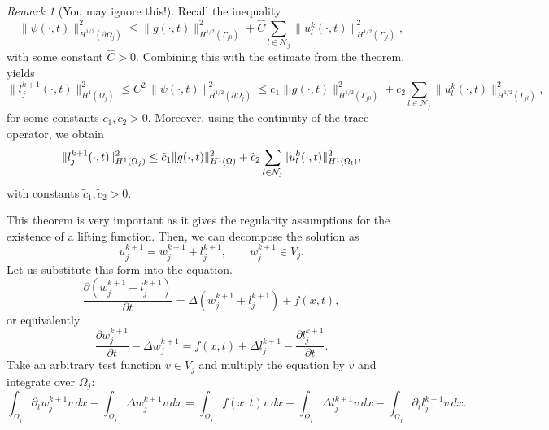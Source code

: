\documentclass[a4paper, 11pt]{article}
\theoremstyle{remark}
\newtheorem{remark}[equation]{Remark}
\begin{document}
\begin{remark}[You may ignore this!]
    Recall the inequality
    \begin{equation*}
        \lVert \psi(\cdot, t)\rVert_{H^{1/2}(\partial\Omega_{j})}^{2} \leq \lVert g(\cdot, t)\rVert_{H^{1/2}(\Gamma_{j0})}^{2} + \hat{C}\sum_{l\in\mathcal{N}_{j}}\lVert u_{l}^{k}(\cdot, t)\rVert_{H^{1/2}(\Gamma_{jl})}^{2},
    \end{equation*}
    with some constant $\hat{C} > 0$. Combining this with the estimate from the theorem, yields
    \begin{equation*}
        \lVert l_j^{k+1}(\cdot, t) \rVert^{2}_{H^1(\Omega_j)} \leq C^{2} \, \lVert \psi(\cdot, t) \rVert^{2}_{H^{1/2}(\partial \Omega_j)} \leq c_{1}\lVert g(\cdot, t)\rVert_{H^{1/2}(\Gamma_{j0})}^{2} + c_{2}\sum_{l\in\mathcal{N}_{j}}\lVert u_{l}^{k}(\cdot, t)\rVert_{H^{1/2}(\Gamma_{jl})}^{2},
    \end{equation*}
    for some constants $c_{1}, c_{2} > 0$. Moreover, using the continuity of the trace operator, we obtain
    \begin{equation*}
        \lVert l_j^{k+1}(\cdot, t) \rVert^{2}_{H^1(\Omega_j)} \leq \Tilde{c}_{1}\lVert g(\cdot, t)\rVert_{H^{1}(\Omega)}^{2} + \Tilde{c}_{2}\sum_{l\in\mathcal{N}_{j}}\lVert u_{l}^{k}(\cdot, t)\rVert_{H^{1}(\Omega_{l})}^{2},
    \end{equation*}
    with constants $\tilde{c}_{1}, \tilde{c}_{2} > 0$.
\end{remark}
This theorem is very important as it gives the regularity assumptions for the existence of a lifting function. Then, we can decompose the solution as
\begin{equation*}
    u_{j}^{k+1} = w^{k+1}_{j} + l_{j}^{k+1}, \qquad w^{k+1}_{j}\in V_{j}.
\end{equation*}
Let us substitute this form into the equation.
\begin{equation*}
    \dfrac{\partial \left(w^{k+1}_{j} + l_{j}^{k+1}\right)}{\partial t} = \Delta \left(w^{k+1}_{j} + l_{j}^{k+1}\right) + f(x, t),
\end{equation*}
or equivalently
\begin{equation*}
    \dfrac{\partial w^{k+1}_{j}}{\partial t} - \Delta w^{k+1}_{j} = f(x, t) + \Delta l_{j}^{k+1} - \dfrac{\partial l_{j}^{k+1}}{\partial t}.
\end{equation*}
Take an arbitrary test function $v\in V_{j}$ and multiply the equation by $v$ and integrate over $\Omega_{j}$:
\begin{equation*}
    \int_{\Omega_{j}}\partial_{t} w^{k+1}_{j} v \,dx - \int_{\Omega_{j}} \Delta w^{k+1}_{j}v \,dx = \int_{\Omega_{j}} f(x, t)v \,dx + \int_{\Omega_{j}} \Delta l_{j}^{k+1} v \,dx - \int_{\Omega_{j}}\partial_{t} l_{j}^{k+1}v \,dx.
\end{equation*}
\end{document}

